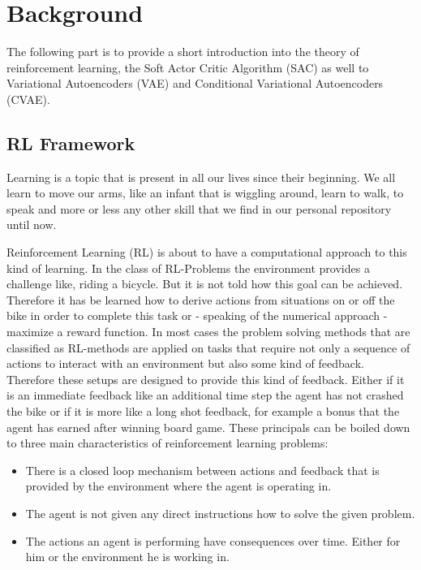 \chapter{Background}\label{chap:background}

The following part is to provide a short introduction into the theory of reinforcement learning, the Soft Actor Critic Algorithm (SAC) as well to Variational Autoencoders (VAE) and Conditional Variational Autoencoders (CVAE).

\section{RL Framework}\label{sec:RL-Framework}

Learning is a topic that is present in all our lives since their beginning. We all learn to move our arms, like an infant that is wiggling around, learn to walk, to speak and more or less any other skill that we find in our personal repository until now.  

Reinforcement Learning (RL) is about to have a computational approach to this kind of learning.
In the class of RL-Problems the environment provides a challenge like, riding a bicycle. But it is not told how this goal can be achieved.  Therefore it has be learned how to derive actions from situations on or off the bike in order to complete this task or - speaking of the numerical approach - maximize a reward function.
In most cases the problem solving methods that are classified as RL-methods are applied on tasks that require not only a sequence of actions to interact with an environment but also some kind of feedback.
Therefore these setups are designed to provide this kind of feedback. Either if it is an immediate feedback like an additional time step the agent has not crashed the bike or if it is more like a long shot feedback, for example a bonus that the agent has earned after winning board game. 
These principals can be boiled down to three main characteristics of reinforcement learning problems:

\begin{itemize}
    \item There is a closed loop mechanism between actions and feedback that is provided by the environment where the agent is operating in.
    \item The agent is not given any direct instructions how to solve the given problem.
    \item The actions an agent is performing have consequences over time. Either for him or the environment he is working in.  
\end{itemize}

